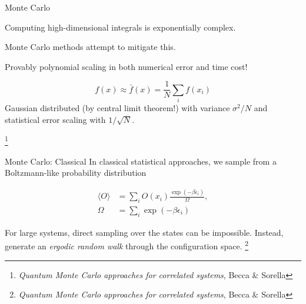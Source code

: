 \documentclass[10pt]{beamer}
\begin{document}
\begin{frame}{Monte Carlo}

Computing high-dimensional integrals is exponentially complex.


Monte Carlo methods attempt to mitigate this.


Provably polynomial scaling in both numerical error and time cost!

$$f(x) \approx \bar{f}(x) = \frac{1}{N}\sum_i f(x_i)$$
Gaussian distributed (by central limit theorem!) with variance $\sigma^2/N$ and statistical error scaling with $1/\sqrt{N}$. 

\footnote{\emph{Quantum Monte Carlo approaches for correlated systems}, Becca \& Sorella}

\end{frame}



\begin{frame}{Monte Carlo: Classical}
In classical statistical approaches, we sample from a Boltzmann-like probability distribution

\begin{align*}
    \langle O\rangle &= \sum_i O(x_i) \frac{\exp(-\beta \epsilon_i)}{\Omega},\\
    \Omega &= \sum_i \exp(-\beta \epsilon_i)
\end{align*} 

For large systems, direct sampling over the states can be impossible. Instead, generate an \emph{ergodic random walk} through the configuration space. 
\footnote{\emph{Quantum Monte Carlo approaches for correlated systems}, Becca \& Sorella}

\end{frame}
\end{document}

